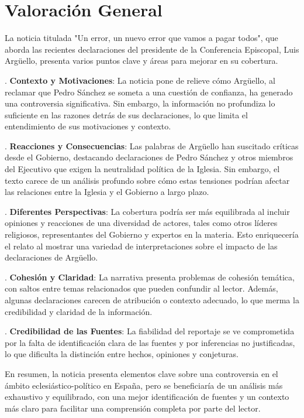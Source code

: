 \documentclass[10pt,a4paper]{article}
\begin{document}
\section*{Valoración General}
    La noticia titulada "Un error, un nuevo error que vamos a pagar todos", que aborda las recientes declaraciones del presidente de la Conferencia Episcopal, Luis Arg\"{u}ello, presenta varios puntos clave y \'{a}reas para mejorar en su cobertura.
\par{}. \textbf{Contexto y Motivaciones}: La noticia pone de relieve c\'{o}mo Arg\"{u}ello, al reclamar que Pedro S\'{a}nchez se someta a una cuesti\'{o}n de confianza, ha generado una controversia significativa. Sin embargo, la informaci\'{o}n no profundiza lo suficiente en las razones detr\'{a}s de sus declaraciones, lo que limita el entendimiento de sus motivaciones y contexto.
\par{}. \textbf{Reacciones y Consecuencias}: Las palabras de Arg\"{u}ello han suscitado cr\'{i}ticas desde el Gobierno, destacando declaraciones de Pedro S\'{a}nchez y otros miembros del Ejecutivo que exigen la neutralidad pol\'{i}tica de la Iglesia. Sin embargo, el texto carece de un an\'{a}lisis profundo sobre c\'{o}mo estas tensiones podr\'{i}an afectar las relaciones entre la Iglesia y el Gobierno a largo plazo.
\par{}. \textbf{Diferentes Perspectivas}: La cobertura podr\'{i}a ser m\'{a}s equilibrada al incluir opiniones y reacciones de una diversidad de actores, tales como otros l\'{i}deres religiosos, representantes del Gobierno y expertos en la materia. Esto enriquecer\'{i}a el relato al mostrar una variedad de interpretaciones sobre el impacto de las declaraciones de Arg\"{u}ello.
\par{}. \textbf{Cohesi\'{o}n y Claridad}: La narrativa presenta problemas de cohesi\'{o}n tem\'{a}tica, con saltos entre temas relacionados que pueden confundir al lector. Adem\'{a}s, algunas declaraciones carecen de atribuci\'{o}n o contexto adecuado, lo que merma la credibilidad y claridad de la informaci\'{o}n.
\par{}. \textbf{Credibilidad de las Fuentes}: La fiabilidad del reportaje se ve comprometida por la falta de identificaci\'{o}n clara de las fuentes y por inferencias no justificadas, lo que dificulta la distinci\'{o}n entre hechos, opiniones y conjeturas.
\par\medskip
En resumen, la noticia presenta elementos clave sobre una controversia en el \'{a}mbito eclesi\'{a}stico-pol\'{i}tico en Espa\~{n}a, pero se beneficiar\'{i}a de un an\'{a}lisis m\'{a}s exhaustivo y equilibrado, con una mejor identificaci\'{o}n de fuentes y un contexto m\'{a}s claro para facilitar una comprensi\'{o}n completa por parte del lector.
\vspace{1em}
\end{document}
